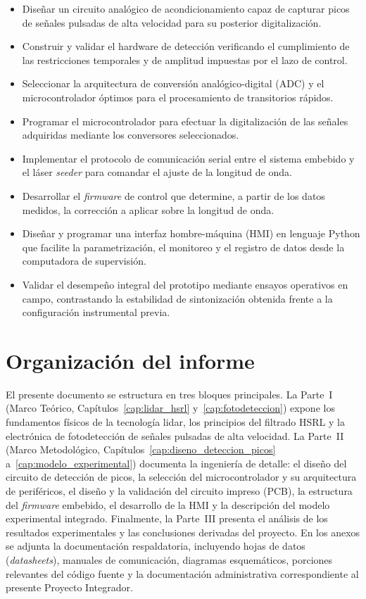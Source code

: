 \begin{itemize}
  \item Diseñar un circuito analógico de acondicionamiento capaz de capturar picos de señales pulsadas de alta velocidad para su posterior digitalización.
  \item Construir y validar el hardware de detección verificando el cumplimiento de las restricciones temporales y de amplitud impuestas por el lazo de control.
  \item Seleccionar la arquitectura de conversión analógico-digital (ADC) y el microcontrolador óptimos para el procesamiento de transitorios rápidos.
  \item Programar el microcontrolador para efectuar la digitalización de las señales adquiridas mediante los conversores seleccionados.
  \item Implementar el protocolo de comunicación serial entre el sistema embebido y el láser \emph{seeder} para comandar el ajuste de la longitud de onda.
  \item Desarrollar el \emph{firmware} de control que determine, a partir de los datos medidos, la corrección a aplicar sobre la longitud de onda.
  \item Diseñar y programar una interfaz hombre-máquina (HMI) en lenguaje Python que facilite la parametrización, el monitoreo y el registro de datos desde la computadora de supervisión.
  \item Validar el desempeño integral del prototipo mediante ensayos operativos en campo, contrastando la estabilidad de sintonización obtenida frente a la configuración instrumental previa.
\end{itemize}

\section{Organización del informe}
\label{sec:organizacion_informe}

El presente documento se estructura en tres bloques principales. La Parte~I (Marco Teórico, Capítulos~\ref{cap:lidar_hsrl} y~\ref{cap:fotodeteccion}) expone los fundamentos físicos de la tecnología lidar, los principios del filtrado HSRL y la electrónica de fotodetección de señales pulsadas de alta velocidad. La Parte~II (Marco Metodológico, Capítulos~\ref{cap:diseno_deteccion_picos} a~\ref{cap:modelo_experimental}) documenta la ingeniería de detalle: el diseño del circuito de detección de picos, la selección del microcontrolador y su arquitectura de periféricos, el diseño y la validación del circuito impreso (PCB), la estructura del \emph{firmware} embebido, el desarrollo de la HMI y la descripción del modelo experimental integrado. Finalmente, la Parte~III presenta el análisis de los resultados experimentales y las conclusiones derivadas del proyecto. En los anexos se adjunta la documentación respaldatoria, incluyendo hojas de datos (\emph{datasheets}), manuales de comunicación, diagramas esquemáticos, porciones relevantes del código fuente y la documentación administrativa correspondiente al presente Proyecto Integrador.